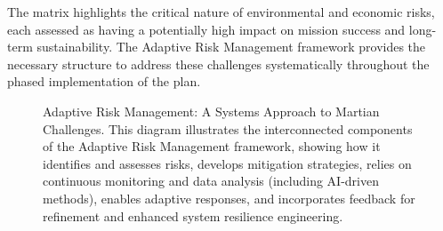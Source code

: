 \documentclass[fontsize=10pt, oneside, DIV=calc]{scrartcl}
\begin{document}
\medskip

\noindent
The matrix highlights the critical nature of environmental and economic risks, each assessed as having a potentially high impact on mission success and long-term sustainability. The Adaptive Risk Management framework provides the necessary structure to address these challenges systematically throughout the phased implementation of the plan.



\begin{figure}[H]
  \centering
  \noindent
  \begin{minipage}{\textwidth}
    \centering
    \caption{Adaptive Risk Management: A Systems Approach to Martian Challenges. This diagram illustrates the interconnected components of the Adaptive Risk Management framework, showing how it identifies and assesses risks, develops mitigation strategies, relies on continuous monitoring and data analysis (including AI-driven methods), enables adaptive responses, and incorporates feedback for refinement and enhanced system resilience engineering.}
  \end{minipage}
\end{figure}

\begin{comment}
@startuml
!theme materia-outline
scale 1.6

skinparam defaultFontColor black
skinparam backgroundColor white


scale 1.6

skinparam defaultFontColor black
skinparam backgroundColor white



title ``Adaptive Risk Management Framework\n(Martian Challenges)''

skinparam componentStyle rectangle

component ``Risk Identification\n& Assessment'' as RIA
component ``Mitigation Strategy\nDevelopment'' as MSD
component ``Continuous Monitoring\n(AI-Driven Analysis)'' as CMA
component ``Adaptive Response\nExecution'' as ARE
component ``Feedback Loop &\nSystem Refinement'' as FSR

component ``Goal:\nEnhanced System\nResilience'' as ESR

' Initial Setup
RIA -down-> MSD : ``Informs''

' Operational Cycle & Feedback
MSD -right-> CMA : ``Guides\nMonitoring''
CMA --> ARE : ``Threat\nDetected''
ARE -down-> FSR : ``Provides\nResponse Data''
FSR -up-> RIA : ``Refines\nRisk Models''
FSR -up-> MSD : ``Improves\nStrategies''
FSR -left-> CMA : ``Adjusts\nAnalysis''

' Contribution to Resilience
RIA .down.> ESR : ``Supports''
MSD .down.> ESR : ``Supports''
CMA .down.> ESR : ``Supports''
ARE .down.> ESR : ``Supports''
FSR .down.> ESR : ``Supports''

@enduml
\end{comment}
\end{document}
